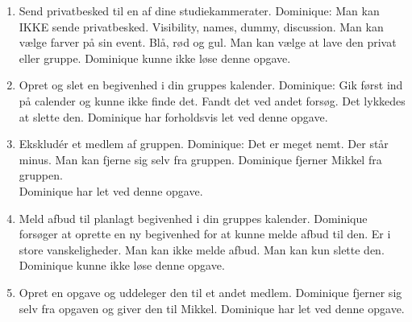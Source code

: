 \documentclass[12pt]{article}
\begin{document}
\begin{enumerate}
\item Send privatbesked til en af dine studiekammerater.
Dominique: Man kan IKKE sende privatbesked. Visibility, names, dummy, discussion. Man kan vælge farver på sin event. Blå, rød og gul. Man kan vælge at lave den privat eller gruppe.
Dominique kunne ikke løse denne opgave.\\

\item Opret og slet en begivenhed i din gruppes kalender.
Dominique: Gik først ind på calender og kunne ikke finde det. Fandt det ved andet forsøg. Det lykkedes at slette den.
Dominique har forholdsvis let ved denne opgave.\\

\item Ekskludér et medlem af gruppen.
Dominique: Det er meget nemt. Der står minus. Man kan fjerne sig selv fra gruppen. Dominique fjerner Mikkel fra gruppen.\\
Dominique har let ved denne opgave.

\item Meld afbud til planlagt begivenhed i din gruppes kalender.
Dominique forsøger at oprette en ny begivenhed for at kunne melde afbud til den. Er i store vanskeligheder. Man kan ikke melde afbud. Man kan kun slette den.\\
Dominique kunne ikke løse denne opgave.\\

\item Opret en opgave og uddeleger den til et andet medlem.
Dominique fjerner sig selv fra opgaven og giver den til Mikkel.
Dominique har let ved denne opgave.\\

\end{enumerate}
\newpage
{}

\end{document}
